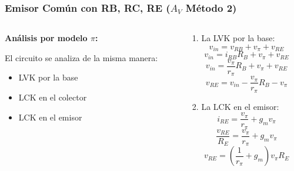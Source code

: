 \begin{frame}[t]
    \frametitle{Emisor Común con RB, RC, RE ($A_V$ Método 2)}

    \begin{columns}
        \begin{column}{0.64\textwidth}
            \textbf{Análisis por modelo $\pi$:}

            \centering
            \begin{figure}[H]
            \end{figure}

            \flushleft
            El circuito se analiza de la misma manera:

            \begin{itemize}
                \item LVK por la base
                \item LCK en el colector
                \item LCK en el emisor
            \end{itemize}
        \end{column}
        \begin{column}{0.36\textwidth}
            1. La LVK por la base:
            \[ v_{in} = v_{RB} + v_\pi + v_{RE} \]
            \[ v_{in} = i_{RB} R_B + v_\pi + v_{RE} \]
            \[ v_{in} = \dfrac{v_\pi}{r_\pi} R_B + v_\pi + v_{RE} \]
            \[ v_{RE} = v_{in} - \dfrac{v_\pi}{r_\pi} R_B - v_\pi \]

            \vspace{3mm}
            2. La LCK en el emisor:
            \[ i_{RE} = \dfrac{v_\pi}{r_\pi} + g_m v_\pi \]
            \[ \dfrac{v_{RE}}{R_E} = \dfrac{v_\pi}{r_\pi} + g_m v_\pi \]
            \[ v_{RE} = \left( \dfrac{1}{r_\pi} + g_m \right) v_\pi R_E \]
        \end{column}
    \end{columns}
\end{frame}

